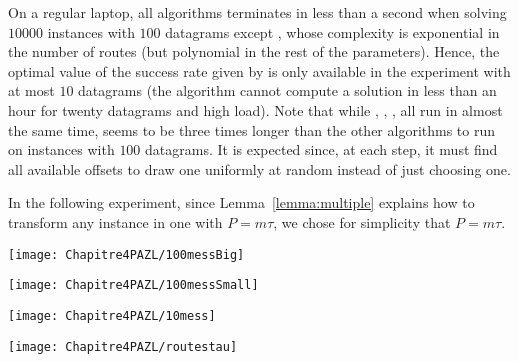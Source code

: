 On a regular laptop, all algorithms terminates in less than a second when solving $10000$ instances with $100$ datagrams except \ESCA, whose complexity is exponential in the number of routes (but polynomial in the rest of the parameters). Hence, the optimal value of the success rate given by \ESCA is only available in the experiment with at most $10$ datagrams (the algorithm cannot compute a solution in less than an hour for twenty datagrams and high load). 
Note that while \firstfit, \compactpair, \metaoffset, \compactfit all run in almost the same time,
\greedyuniform seems to be three times longer than the other algorithms to run on instances with $100$ datagrams. It is expected since, at each step, it must find all available offsets to draw one uniformly at random instead of just choosing one.

In the following experiment, since Lemma~\ref{lemma:multiple} explains how to transform any instance in one with  $P = m\tau$, we chose for simplicity that $P = m\tau$.

\begin{minipage}[c]{.49\linewidth}

\begin{center}
\texttt{[image: Chapitre4PAZL/100messBig]}

\label{fig:100messBig}
\end{center} 
\end{minipage}
\begin{minipage}[c]{.45\linewidth}
\begin{center}  
\texttt{[image: Chapitre4PAZL/100messSmall]}
\label{fig:100messSmall}
\end{center}
\end{minipage}



\begin{minipage}[c]{.49\linewidth}

\begin{center}
\texttt{[image: Chapitre4PAZL/10mess]}
\end{center}
\label{fig:10mess}
\end{minipage}
\begin{minipage}[c]{.45\linewidth}
\begin{center}
\texttt{[image: Chapitre4PAZL/routestau]}
\end{center}
\label{fig:shortroutes}
\end{minipage}

